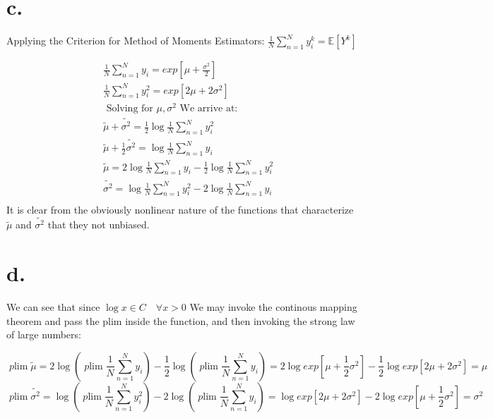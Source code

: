 \documentclass{paper}
\DeclareMathOperator*{\plim}{\mathit{p}lim}
\begin{document}
\section*{c.}
Applying the Criterion for Method of Moments Estimators: $ \frac{1}{N} \sum_{n=1}^N y_i^k = \mathbb{E}[Y^k]$

\begin{equation*}
\begin{alignedat}{2}
&\frac{1}{N} \sum_{n=1}^N y_i = exp[ \mu + \frac{ \sigma^2}{2 }]\\
&\frac{1}{N} \sum_{n=1}^N y_i^2 = exp[ 2 \mu + 2 \sigma^2 ]\\
&\text{ Solving for } \mu, \sigma^2 \text{ We arrive at: }\\
&\widetilde{ \mu } + \widetilde{ \sigma^2 } = \frac{1}{2} \log{ \frac{1}{N} \sum_{n=1}^N y_i^2 }\\
&\widetilde{ \mu } + \frac{1}{2} \widetilde{ \sigma^2 } = \log{ \frac{1}{N} \sum_{n=1}^N y_i }\\
&\widetilde{ \mu } = 2 \log{ \frac{1}{N} \sum_{n=1}^N y_i } - \frac{1}{2} \log{ \frac{1}{N} \sum_{n=1}^N y_i^2 }\\
&\widetilde{ \sigma^2 } = \log{ \frac{1}{N} \sum_{n=1}^N y_i^2 } - 2 \log{ \frac{1}{N} \sum_{n=1}^N y_i }\\
\end{alignedat}
\end{equation*}
It is clear from the obviously nonlinear nature of the functions that characterize $\widetilde{ \mu }$ and $\widetilde{ \sigma^2 }$ that they not unbiased.

\section*{d.}
We can see that since $\log{x} \in C \quad \forall x > 0$ We may invoke the continous mapping theorem and pass the plim inside the function, and then invoking the strong law of large numbers:

$$\plim \widetilde{ \mu } = 2 \log{( \plim \frac{1}{N} \sum_{n=1}^N y_i )} - \frac{1}{2} \log{( \plim \frac{1}{N} \sum_{n=1}^N y_i )} = 2 \log{ exp[ \mu + \frac{1}{2}\sigma^2 ] } - \frac{1}{2} \log{ exp[ 2 \mu + 2 \sigma^2 ] } = \mu$$
$$\plim \widetilde{ \sigma^2 } = \log{( \plim \frac{1}{N} \sum_{n=1}^N y_i^2 )} - 2 \log{( \plim \frac{1}{N} \sum_{n=1}^N y_i )} = \log{ exp[ 2 \mu + 2 \sigma^2 ] } - 2\log{ exp[ \mu + \frac{1}{2}\sigma^2 ] } = \sigma^2$$
\end{document}
